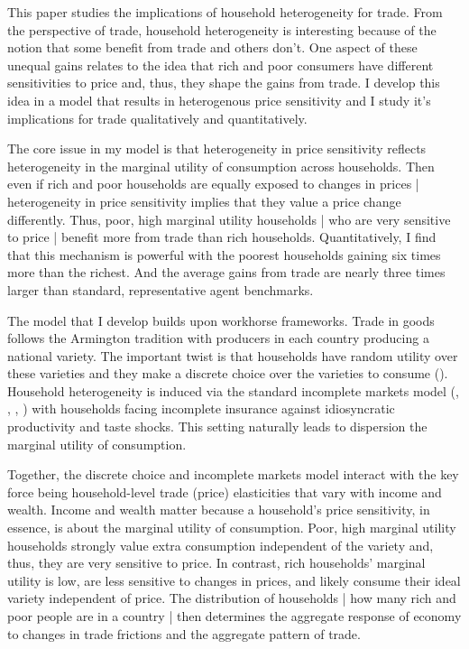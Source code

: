 \documentclass[12pt,pdftex]{article}
\begin{document}
\begin{onehalfspacing}
\hspace{-0.05cm}



\thispagestyle{empty}
\newpage
\normalsize

This paper studies the implications of household heterogeneity for trade. From the perspective of trade, household heterogeneity is interesting because of the notion that some benefit from trade and others don't. One aspect of these unequal gains relates to the idea that rich and poor consumers have different sensitivities to price and, thus, they shape the gains from trade.  I develop this idea in a model that results in heterogenous price sensitivity and I study it's implications for trade qualitatively and quantitatively.

The core issue in my model is that heterogeneity in price sensitivity reflects heterogeneity in the marginal utility of consumption across households. Then even if rich and poor households are equally exposed to changes in prices | heterogeneity in price sensitivity implies that they value a price change differently. Thus, poor, high marginal utility households | who are very sensitive to price | benefit more from trade than rich households. Quantitatively, I find that this mechanism is powerful with the poorest households gaining six times more than the richest. And the average gains from trade are nearly three times larger than standard, representative agent benchmarks.

The model that I develop builds upon workhorse frameworks. Trade in goods follows the Armington tradition with producers in each country producing a national variety. The important twist is that households have random utility over these varieties and they make a discrete choice over the varieties to consume (\citet{mcfadden1974frontiers}).  Household heterogeneity is induced via the standard incomplete markets model (\citet{bewley1979optimum}, \citet{imrohorouglu1989cost}, \citet{huggett1993risk}, \citet{aiyagari1994uninsured}) with households facing incomplete insurance against idiosyncratic productivity and taste shocks. This setting naturally leads to dispersion the marginal utility of consumption.

Together, the discrete choice and incomplete markets model interact with the key force being household-level trade (price) elasticities that vary with income and wealth. Income and wealth matter because a household's price sensitivity, in essence, is about the marginal utility of consumption. Poor, high marginal utility households strongly value extra consumption independent of the variety and, thus, they are very sensitive to price. In contrast, rich households' marginal utility is low, are less sensitive to changes in prices, and likely consume their ideal variety independent of price. The distribution of households | how many rich and poor people are in a country | then determines the aggregate response of economy to changes in trade frictions and the aggregate pattern of trade.


\end{onehalfspacing}
\end{document}
